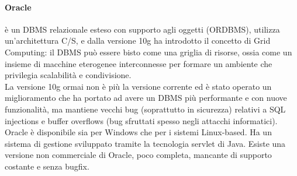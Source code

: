 \documentclass[a4paper]{report}
\begin{document}
\paragraph{Oracle} è un DBMS relazionale esteso con supporto agli oggetti (ORDBMS), utilizza un'architettura C/S, e dalla versione 10g ha introdotto il concetto di Grid Computing: il DBMS può essere bisto come una griglia di risorse, ossia come un insieme di macchine eterogenee interconnesse per formare un ambiente che privilegia scalabilità e condivisione.\\
La versione 10g ormai non è più la versione corrente ed è stato operato un miglioramento che ha portato ad avere un DBMS più performante e con nuove funzionalità, ma mantiene vecchi bug (soprattutto in sicurezza) relativi a SQL injections e buffer overflows (bug sfruttati spesso negli attacchi informatici).\\
Oracle è disponibile sia per Windows che per i sistemi Linux-based. Ha un sistema di gestione sviluppato tramite la tecnologia servlet di Java. Esiste una versione non commerciale di Oracle, poco completa, mancante di supporto costante e senza bugfix.\\
\end{document}
